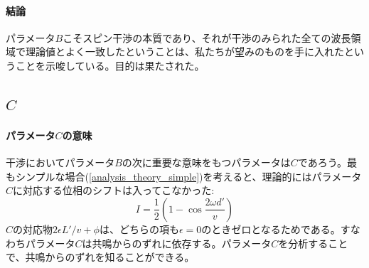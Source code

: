 \paragraph{結論}
パラメータ$B$こそスピン干渉の本質であり、それが干渉のみられた全ての波長領域で理論値とよく一致したということは、私たちが望みのものを手に入れたということを示唆している。目的は果たされた。

\subsection{$C$}
\paragraph{パラメータ$C$の意味}
干渉においてパラメータ$B$の次に重要な意味をもつパラメータは$C$であろう。最もシンプルな場合(\ref{analysis_theory_simple})を考えると、理論的にはパラメータ$C$に対応する位相のシフトは入ってこなかった:
\begin{equation}
I=\frac{1}{2}\left(1-\cos\frac{2\omega d'}{v}\right)
\end{equation}
$C$の対応物$2\epsilon L'/v +\phi$は、どちらの項も$\epsilon=0$のときゼロとなるためである。すなわちパラメータ$C$は共鳴からのずれに依存する。パラメータ$C$を分析することで、共鳴からのずれを知ることができる。

